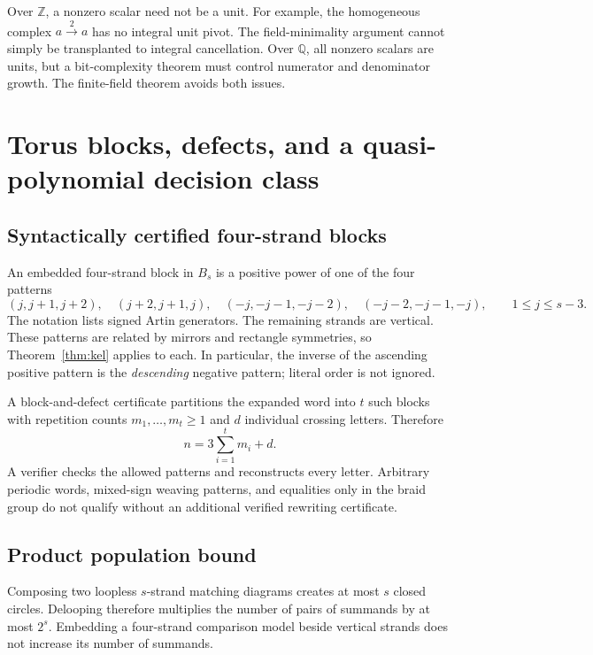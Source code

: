 \documentclass[11pt,letterpaper]{article}
\theoremstyle{remark}\newtheorem{remark}[theorem]{Remark}
\begin{document}
Over $\mathbb Z$, a nonzero scalar need not be a unit. For example, the homogeneous complex $a\xrightarrow{2}a$ has no integral unit pivot. The field-minimality argument cannot simply be transplanted to integral cancellation. Over $\mathbb Q$, all nonzero scalars are units, but a bit-complexity theorem must control numerator and denominator growth. The finite-field theorem avoids both issues.

\section{Torus blocks, defects, and a quasi-polynomial decision class}\label{sec:blocks}
\subsection{Syntactically certified four-strand blocks}
An embedded four-strand block in $B_s$ is a positive power of one of the four patterns
\begin{equation}\label{eq:patterns}
 (j,j+1,j+2),\quad(j+2,j+1,j),\quad
 (-j,-j-1,-j-2),\quad(-j-2,-j-1,-j),
 \qquad 1\le j\le s-3.
\end{equation}
The notation lists signed Artin generators. The remaining strands are vertical. These patterns are related by mirrors and rectangle symmetries, so Theorem~\ref{thm:kel} applies to each. In particular, the inverse of the ascending positive pattern is the \emph{descending} negative pattern; literal order is not ignored.

A block-and-defect certificate partitions the expanded word into $t$ such blocks with repetition counts $m_1,\ldots,m_t\ge1$ and $d$ individual crossing letters. Therefore
\begin{equation}\label{eq:nrelation}
 n=3\sum_{i=1}^t m_i+d.
\end{equation}
A verifier checks the allowed patterns and reconstructs every letter. Arbitrary periodic words, mixed-sign weaving patterns, and equalities only in the braid group do not qualify without an additional verified rewriting certificate.

\subsection{Product population bound}
Composing two loopless $s$-strand matching diagrams creates at most $s$ closed circles. Delooping therefore multiplies the number of pairs of summands by at most $2^s$. Embedding a four-strand comparison model beside vertical strands does not increase its number of summands.
\end{document}
